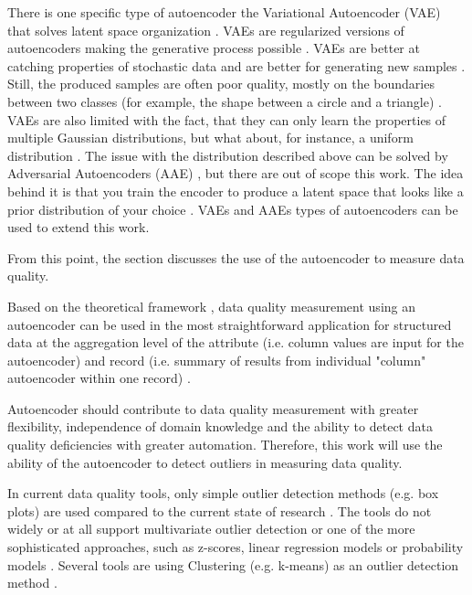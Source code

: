 		There is one specific type of autoencoder the Variational Autoencoder (VAE) that solves latent space organization \cite{Purkait2019}\cite{Rocca2019}. VAEs are regularized versions of autoencoders making the generative process possible \cite{Purkait2019}. VAEs are better at catching properties of stochastic data and are better for generating new samples \cite{Rocca2019}. Still, the produced samples are often poor quality, mostly on the boundaries between two classes (for example, the shape between a circle and a triangle) \cite{Rocca2019}. VAEs are also limited with the fact, that they can only learn the properties of multiple Gaussian distributions, but what about, for instance, a uniform distribution \cite{Janz2019}.  The issue with the distribution described above can be solved by Adversarial Autoencoders (AAE) \cite{Janz2019}, but there are out of scope this work. The idea behind it is that you train the encoder to produce a latent space that looks like a prior distribution of your choice \cite{Janz2019}. VAEs and AAEs types of autoencoders can be used to extend this work.
		
		From this point, the section discusses the use of the autoencoder to measure data quality. 
		
		Based on the theoretical framework , data quality measurement using an autoencoder can be used in the most straightforward application for structured data  at the aggregation level of the attribute (i.e. column values are input for the autoencoder) and record (i.e. summary of results from individual "column" autoencoder within one record) .		
		
		Autoencoder should contribute to data quality measurement with greater flexibility, independence of domain knowledge and the ability to detect data quality deficiencies with greater automation. Therefore, this work will use the ability of the autoencoder to detect outliers in measuring data quality. 
		
		In current data quality tools, only simple outlier detection methods (e.g. box plots) are used compared to the current state of research \cite{Ehrlinger2019}. The tools do not widely or at all support multivariate outlier detection or one of the more sophisticated approaches, such as z-scores, linear regression models or probability models \cite{Ehrlinger2019}. Several tools are using Clustering (e.g. k-means) as an outlier detection method \cite{Ehrlinger2019}.
			
